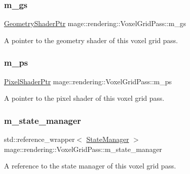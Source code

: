 \subsubsection{\texorpdfstring{m\+\_\+gs}{m\_gs}}
{\footnotesize\ttfamily \hyperlink{namespacemage_1_1rendering_aa5d63f80f9483d0896718813768ba1cf}{Geometry\+Shader\+Ptr} mage\+::rendering\+::\+Voxel\+Grid\+Pass\+::m\+\_\+gs\hspace{0.3cm}{\ttfamily [private]}}

A pointer to the geometry shader of this voxel grid pass. \hypertarget{classmage_1_1rendering_1_1_voxel_grid_pass_a19cb04ed26d43e59277ffef4039a051d}{}\label{classmage_1_1rendering_1_1_voxel_grid_pass_a19cb04ed26d43e59277ffef4039a051d} 
\subsubsection{\texorpdfstring{m\+\_\+ps}{m\_ps}}
{\footnotesize\ttfamily \hyperlink{namespacemage_1_1rendering_af03d922b228ee9c8542baaa2ecc9f259}{Pixel\+Shader\+Ptr} mage\+::rendering\+::\+Voxel\+Grid\+Pass\+::m\+\_\+ps\hspace{0.3cm}{\ttfamily [private]}}

A pointer to the pixel shader of this voxel grid pass. \hypertarget{classmage_1_1rendering_1_1_voxel_grid_pass_ab1072fa557827f7e71f2094ce25f733e}{}\label{classmage_1_1rendering_1_1_voxel_grid_pass_ab1072fa557827f7e71f2094ce25f733e} 
\subsubsection{\texorpdfstring{m\+\_\+state\+\_\+manager}{m\_state\_manager}}
{\footnotesize\ttfamily std\+::reference\+\_\+wrapper$<$ \hyperlink{classmage_1_1rendering_1_1_state_manager}{State\+Manager} $>$ mage\+::rendering\+::\+Voxel\+Grid\+Pass\+::m\+\_\+state\+\_\+manager\hspace{0.3cm}{\ttfamily [private]}}

A reference to the state manager of this voxel grid pass. \hypertarget{classmage_1_1rendering_1_1_voxel_grid_pass_a56d7195f315485c26ae690b1512a3c5e}{}\label{classmage_1_1rendering_1_1_voxel_grid_pass_a56d7195f315485c26ae690b1512a3c5e} 
